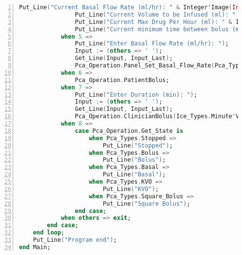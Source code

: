 \begin{lstlisting}[language=ada, gobble=0, numbers=left, caption={\lstinline{Main} procedure}, label={listing:pca_ravenscar:main}]
                Put_Line("Current Basal Flow Rate (ml/hr): " & Integer'Image(Integer(Pca_Operation.Panel_Get_Basal_Flow_Rate)));
                Put_Line("Current Volume to be Infused (ml): " & Integer'Image(Integer(Pca_Operation.Panel_Get_Vtbi)));
                Put_Line("Current Max Drug Per Hour (ml): " & Integer'Image(Integer(Pca_Operation.Panel_Get_Max_Drug_Per_Hour)));
                Put_Line("Current minimum time between bolus (min): " & Integer'Image(Integer(Pca_Operation.Panel_Get_Minimum_Time_Between_Bolus)));
            when 5 =>
                Put_Line("Enter Basal Flow Rate (ml/hr): ");
                Input := (others => ' ');
                Get_Line(Input, Input_Last);
                Pca_Operation.Panel_Set_Basal_Flow_Rate(Pca_Types.Flow_Rate(Integer'Value(Input)));
            when 6 =>
                Pca_Operation.PatientBolus;
            when 7 =>
                Put_Line("Enter Duration (min): ");
                Input := (others => ' ');
                Get_Line(Input, Input_Last);
                Pca_Operation.ClinicianBolus(Ice_Types.Minute'Value(Input));
            when 8 =>
                case Pca_Operation.Get_State is
                    when Pca_Types.Stopped =>
                        Put_Line("Stopped");
                    when Pca_Types.Bolus =>
                        Put_Line("Bolus");
                    when Pca_Types.Basal =>
                        Put_Line("Basal");
                    when Pca_Types.KVO =>
                        Put_Line("KVO");
                    when Pca_Types.Square_Bolus =>
                        Put_Line("Square Bolus");
                end case;
            when others => exit;
        end case;
    end loop;
    Put_Line("Program end");
end Main;
\end{lstlisting} 
\doublespacing